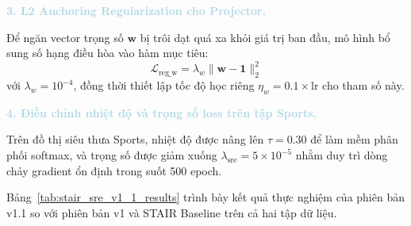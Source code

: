 \noindent\textcolor{lightblue}{\textbf{3. L2 Anchoring Regularization cho Projector.}}

Để ngăn vector trọng số $\mathbf{w}$ bị trôi dạt quá xa khỏi giá trị ban đầu, mô hình bổ sung số hạng điều hòa vào hàm mục tiêu:
\begin{equation}
\mathcal{L}_{\text{reg\_w}} = \lambda_w \|\mathbf{w} - \mathbf{1}\|_2^2
\end{equation}
với $\lambda_w = 10^{-4}$, đồng thời thiết lập tốc độ học riêng $\eta_w = 0.1 \times \text{lr}$ cho tham số này.

\noindent\textcolor{lightblue}{\textbf{4. Điều chỉnh nhiệt độ và trọng số loss trên tập Sports.}}

Trên đồ thị siêu thưa Sports, nhiệt độ được nâng lên $\tau = 0.30$ để làm mềm phân phối softmax, và trọng số được giảm xuống $\lambda_{\text{sre}} = 5 \times 10^{-5}$ nhằm duy trì dòng chảy gradient ổn định trong suốt 500 epoch.

Bảng~\ref{tab:stair_sre_v1_1_results} trình bày kết quả thực nghiệm của phiên bản v1.1 so với phiên bản v1 và STAIR Baseline trên cả hai tập dữ liệu.

